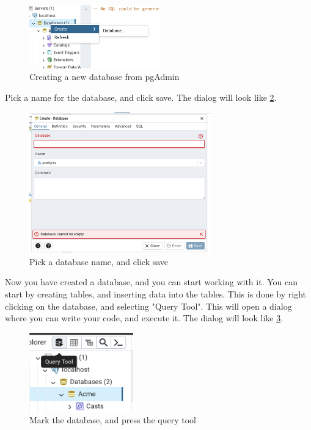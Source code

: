 \begin{figure}[H]
    \centering
    \includegraphics[width=0.5\textwidth]{content/1-relational-databases/figures/pgadmin/6.png}
    \caption{Creating a new database from pgAdmin}
    \label{fig:1.pgadmin6}
\end{figure}

Pick a name for the database, and click save. The dialog will look like \cref{fig:1.pgadmin7}.

\begin{figure}[H]
    \centering
    \includegraphics[width=0.7\textwidth]{content/1-relational-databases/figures/pgadmin/7.png}
    \caption{Pick a database name, and click save}
    \label{fig:1.pgadmin7}
\end{figure}

Now you have created a database, and you can start working with it. You can start by creating tables, and inserting data into the tables. This is done by right clicking on the database, and selecting "Query Tool". This will open a dialog where you can write your code, and execute it. The dialog will look like \cref{fig:1.pgadmin8}.

\begin{figure}[H]
    \centering
    \includegraphics[width=0.4\textwidth]{content/1-relational-databases/figures/pgadmin/8.png}
    \caption{Mark the database, and press the query tool}
    \label{fig:1.pgadmin8}
\end{figure}


